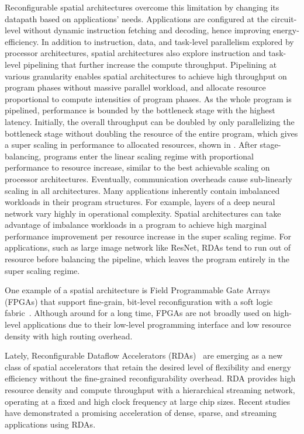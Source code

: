 Reconfigurable spatial architectures overcome this limitation by changing its datapath based on applications' needs.
Applications are configured at the circuit-level without dynamic instruction fetching and decoding, hence improving energy-efficiency.
In addition to instruction, data, and task-level parallelism explored by processor architectures, spatial architectures also explore instruction and task-level
pipelining that further increase the compute throughput.
Pipelining at various granularity enables spatial architectures to achieve high throughput on program phases without massive parallel workload, and allocate resource proportional to compute intensities of program phases.
As the whole program is pipelined, performance is bounded by the bottleneck stage with the highest latency.
Initially, the overall throughput can be doubled by only parallelizing the bottleneck stage without doubling the resource of the entire program, which gives a super scaling in performance to allocated resources, shown in .
After stage-balancing, programs enter the linear scaling regime with proportional performance to resource increase, similar
to the best achievable scaling on processor architectures.
Eventually, communication overheads cause sub-linearly scaling in all architectures.
Many applications inherently contain imbalanced workloads in their program structures. 
For example, layers of a deep neural network vary highly in operational complexity.
Spatial architectures can take advantage of imbalance workloads in a program to achieve
high marginal performance improvement per resource increase in the super scaling regime.
For applications, such as large image network like ResNet\cite{resnet}, RDAs tend to run out of resource before
balancing the pipeline, which leaves the program entirely in the super scaling regime.

One example of a spatial architecture is Field Programmable Gate Arrays (FPGAs) that support fine-grain, 
bit-level reconfiguration with a soft logic fabric~\cite{fpga-survey}.
Although around for a long time, FPGAs are not broadly used on high-level applications due to their low-level programming interface 
and low resource density with high routing overhead.

Lately, Reconfigurable Dataflow Accelerators (RDAs)~\cite{plasticine, ti} are emerging as a new class of spatial accelerators that retain the desired level of flexibility and energy efficiency without the fine-grained reconfigurability overhead.
RDA provides high resource density and compute throughput with a hierarchical streaming network, operating at a fixed and high clock frequency at large chip sizes.
Recent studies~\cite{plasticine} have demonstrated a promising acceleration of dense, sparse, and streaming applications using RDAs.

